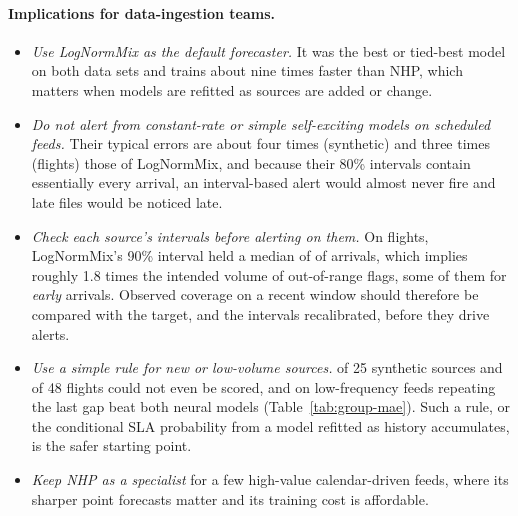 \documentclass[10pt,twocolumn]{article}
\newcommand{\LNM}{LogNormMix}
\newcommand{\NHP}{NHP}
\begin{document}
\paragraph{Implications for data-ingestion teams.}
\begin{itemize}
\item \emph{Use \LNM{} as the default forecaster.} It was the best or tied-best model on both data
  sets and trains about nine times faster than \NHP{}, which matters when models are refitted as
  sources are added or change.
\item \emph{Do not alert from constant-rate or simple self-exciting models on scheduled feeds.} Their
  typical errors are about four times (synthetic) and three times (flights) those of \LNM{}, and
  because their 80\% intervals contain essentially every arrival, an interval-based alert would
  almost never fire and late files would be noticed late.
\item \emph{Check each source's intervals before alerting on them.} On flights, \LNM's 90\% interval
  held a median of \BtsLogNormMixCovNinety{} of arrivals, which implies roughly 1.8 times the intended
  volume of out-of-range flags, some of them for \emph{early} arrivals. Observed coverage on a recent
  window should therefore be compared with the target, and the intervals recalibrated, before they
  drive alerts.
\item \emph{Use a simple rule for new or low-volume sources.} \SynNLowN{} of 25 synthetic sources and
  \BtsNLowN{} of 48 flights could not even be scored, and on low-frequency feeds repeating the last
  gap beat both neural models (Table~\ref{tab:group-mae}). Such a rule, or the conditional SLA
  probability from a model refitted as history accumulates, is the safer starting point.
\item \emph{Keep \NHP{} as a specialist} for a few high-value calendar-driven feeds, where its sharper
  point forecasts matter and its training cost is affordable.
\end{itemize}
\end{document}
